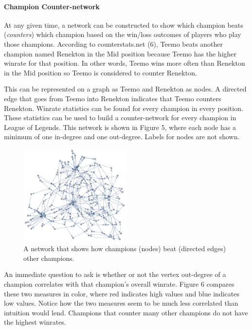 \documentclass[twoside]{article}
\begin{document}
\begin{multicols}{2}
\paragraph{Champion Counter-network}
At any given time, a network can be constructed to show which champion beats (\textit{counters}) which champion based on the win/loss outcomes of players who play those champions. According to counterstats.net (6), Teemo beats another champion named Renekton in the Mid position because Teemo has the higher winrate for that position. In other words, Teemo wins more often than Renekton in the Mid position so Teemo is considered to counter Renekton. 

This can be represented on a graph as Teemo and Renekton as nodes. A directed edge that goes from Teemo into Renekton indicates that Teemo counters Renekton. Winrate statistics can be found for every champion in every position. These statistics can be used to build a counter-network for every champion in League of Legends. This network is shown in Figure 5, where each node has a minimum of one in-degree and one out-degree. Labels for nodes are not shown.

\begin{figure}
  \centering
    \includegraphics[width=0.5\textwidth]{metagraph.pdf}
  \caption{A network that shows how champions (nodes) beat (directed edges) other champions.}
  \label{fig:workflowedge}
\end{figure}

An immediate question to ask is whether or not the vertex out-degree of a champion correlates with that champion's overall winrate. Figure 6 compares these two measures in color, where red indicates high values and blue indicates low values. Notice how the two measures seem to be much less correlated than intuition would lend. Champions that counter many other champions do not have the highest winrates.


\end{multicols}
\end{document}
